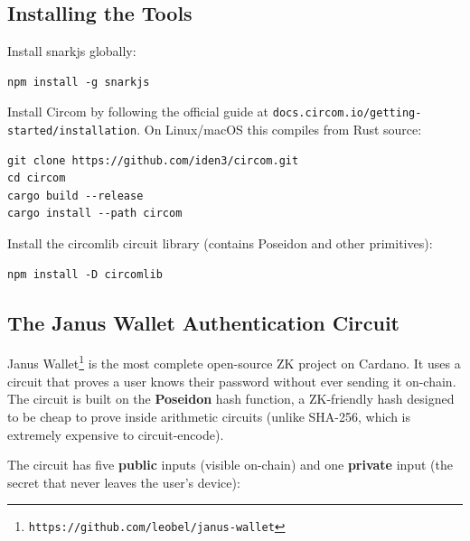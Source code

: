 \subsection*{Installing the Tools}

Install snarkjs globally:

\begin{verbatim}
npm install -g snarkjs
\end{verbatim}

Install Circom by following the official guide at \texttt{docs.circom.io/getting-started/installation}. On Linux/macOS this compiles from Rust source:

\begin{verbatim}
git clone https://github.com/iden3/circom.git
cd circom
cargo build --release
cargo install --path circom
\end{verbatim}

Install the circomlib circuit library (contains Poseidon and other primitives):

\begin{verbatim}
npm install -D circomlib
\end{verbatim}

\subsection*{The Janus Wallet Authentication Circuit}

Janus Wallet\footnote{\texttt{https://github.com/leobel/janus-wallet}} is the most complete open-source ZK project on Cardano. It uses a circuit that proves a user knows their password without ever sending it on-chain. The circuit is built on the \textbf{Poseidon} hash function, a ZK-friendly hash designed to be cheap to prove inside arithmetic circuits (unlike SHA-256, which is extremely expensive to circuit-encode).

The circuit has five \textbf{public} inputs (visible on-chain) and one \textbf{private} input (the secret that never leaves the user's device):


